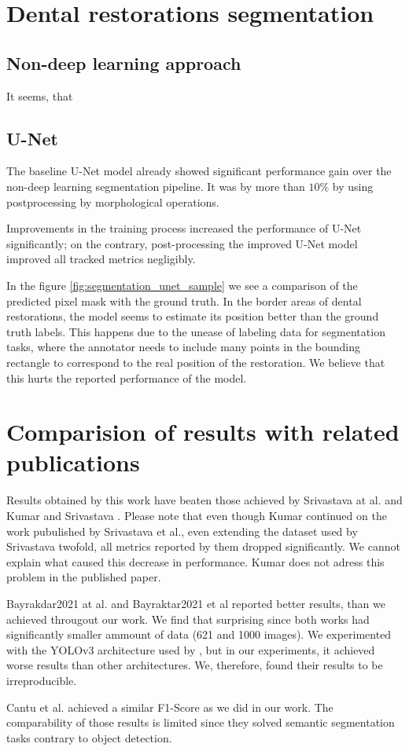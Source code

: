 \section{Dental restorations segmentation}
\subsection{Non-deep learning approach}
It seems, that
\subsection{U-Net}
The baseline U-Net model already showed significant performance gain over the non-deep learning segmentation pipeline. It was by more than $10\%$ by using postprocessing by morphological operations.

Improvements in the training process increased the performance of U-Net significantly; on the contrary, post-processing the improved U-Net model improved all tracked metrics negligibly.

In the figure \ref{fig:segmentation_unet_sample} we see a comparison of the predicted pixel mask with the ground truth. In the border areas of dental restorations, the model seems to estimate its position better than the ground truth labels. This happens due to the unease of labeling data for segmentation tasks, where the annotator needs to include many points in the bounding rectangle to correspond to the real position of the restoration. We believe that this hurts the reported performance of the model.



\section{Comparision of results with related publications}

Results obtained by this work have beaten those achieved by Srivastava at al. \cite{Srivastava2017} and Kumar and Srivastava \cite{Kumar}. Please note that even though Kumar continued on the work pubulished by Srivastava et al., even extending the dataset used by Srivastava twofold, all metrics reported by them dropped significantly. We cannot explain what caused this decrease in performance. Kumar does not adress this problem in the published paper.

Bayrakdar2021 at al. \cite{Bayrakdar2021} and Bayraktar2021 et al \cite{Bayraktar2021} reported better results, than we achieved througout our work. We find that surprising since both works had significantly smaller ammount of data (621 and 1000 images). We experimented with the YOLOv3 architecture used by \cite{Bayraktar2021}, but in our experiments, it achieved worse results than other architectures. We, therefore, found their results to be irreproducible.

Cantu et al. achieved a similar F1-Score as we did in our work. The comparability of those results is limited since they solved semantic segmentation tasks contrary to object detection.
